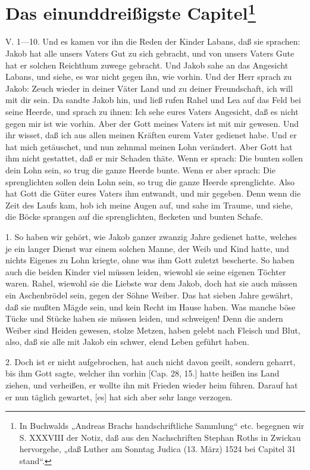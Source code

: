 \section[Das einunddreißigste Capitel]{Das einunddreißigste Capitel\footnote{In Buchwalds „Andreas Brachs handschriftliche Sammlung“ etc. begegnen wir S. XXXVIII der Notiz, daß aus den Nachschriften Stephan Roths in Zwickau hervorgehe, „daß Luther am Sonntag Judica (13. März) 1524 bei Capitel 31 stand“.}}

V. 1—10. Und es kamen vor ihn die Reden der Kinder Labans, daß sie sprachen: Jakob hat alle unsers Vaters Gut zu sich gebracht, und von unsers Vaters Gute hat er solchen Reichthum zuwege gebracht. Und Jakob sahe an das Angesicht Labans, und siehe, es war nicht gegen ihn, wie vorhin. Und der Herr sprach zu Jakob: Zeuch wieder in deiner Väter Land und zu deiner Freundschaft, ich will mit dir sein. Da sandte Jakob hin, und ließ rufen Rahel und Lea auf das Feld bei seine Heerde, und sprach zu ihnen: Ich sehe eures Vaters Angesicht, daß es nicht gegen mir ist wie vorhin. Aber der Gott meines Vaters ist mit mir gewesen. Und ihr wisset, daß ich aus allen meinen Kräften eurem Vater gedienet habe. Und er hat mich getäuschet, und nun zehnmal meinen Lohn verändert. Aber Gott hat ihm nicht gestattet, daß er mir Schaden thäte. Wenn er sprach: Die bunten sollen dein Lohn sein, so trug die ganze Heerde bunte. Wenn er aber sprach: Die sprenglichten sollen dein Lohn sein, so trug die ganze Heerde sprenglichte. Also hat Gott die Güter eures Vaters ihm entwandt, und mir gegeben. Denn wenn die Zeit des Laufs kam, hob ich meine Augen auf, und sahe im Traume, und siehe, die Böcke sprangen auf die sprenglichten, flecketen und bunten Schafe.

1. So haben wir gehört, wie Jakob ganzer zwanzig Jahre gedienet hatte, welches je ein langer Dienst war einem solchen Manne, der Weib und Kind hatte, und nichts Eigenes zu Lohn kriegte, ohne was ihm Gott zuletzt bescherte. So haben auch die beiden Kinder viel müssen leiden, wiewohl sie seine eigenen Töchter waren. Rahel, wiewohl sie die Liebste war dem Jakob, doch hat sie auch müssen ein Aschenbrödel sein, gegen der Söhne Weiber. Das hat sieben Jahre gewährt, daß sie mußten Mägde sein, und kein Recht im Hause haben. Was manche böse Tücke und Stücke haben sie müssen leiden, und schweigen! Denn die andern Weiber sind Heiden gewesen, stolze Metzen, haben gelebt nach Fleisch und Blut, also, daß sie alle mit Jakob ein schwer, elend Leben geführt haben.

2. Doch ist er nicht aufgebrochen, hat auch nicht davon geeilt, sondern geharrt, bis ihm Gott sagte, welcher ihn vorhin [Cap. 28, 15.] hatte heißen ins Land ziehen, und verheißen, er wollte ihn mit Frieden wieder heim führen. Darauf hat er nun täglich gewartet, [es] hat sich aber sehr lange verzogen.

